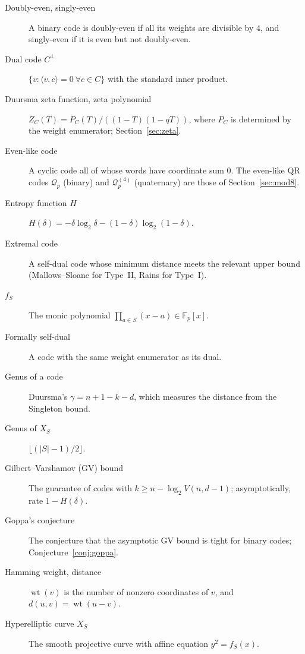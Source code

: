 \documentclass[12pt,letterpaper]{article}
\theoremstyle{definition}
\theoremstyle{remark}
\numberwithin{equation}{section}
\newcommand{\Fp}{\mathbb{F}_p}
\newcommand{\wt}{\operatorname{wt}}
\begin{document}
\begin{description}
\item[Doubly-even, singly-even] A binary code is doubly-even if all its weights are
divisible by $4$, and singly-even if it is even but not doubly-even.

\item[Dual code $C^\perp$] $\{v:\langle v,c\rangle=0\ \forall c\in C\}$ with the
standard inner product.

\item[Duursma zeta function, zeta polynomial] $Z_C(T)=P_C(T)/((1-T)(1-qT))$, where
$P_C$ is determined by the weight enumerator; Section~\ref{sec:zeta}.

\item[Even-like code] A cyclic code all of whose words have coordinate sum $0$. The
even-like QR codes $\mathcal Q_p$ (binary) and $\mathcal Q^{(4)}_p$ (quaternary) are
those of Section~\ref{sec:mod8}.

\item[Entropy function $H$] $H(\delta)=-\delta\log_2\delta-(1-\delta)\log_2(1-\delta)$.

\item[Extremal code] A self-dual code whose minimum distance meets the relevant
upper bound (Mallows--Sloane for Type~II, Rains for Type~I).

\item[$f_S$] The monic polynomial $\prod_{a\in S}(x-a)\in\Fp[x]$.

\item[Formally self-dual] A code with the same weight enumerator as its dual.

\item[Genus of a code] Duursma's $\gamma=n+1-k-d$, which measures the distance from
the Singleton bound.

\item[Genus of $X_S$] $\lfloor(|S|-1)/2\rfloor$.

\item[Gilbert--Varshamov (GV) bound] The guarantee of codes with
$k\ge n-\log_2V(n,d-1)$; asymptotically, rate $1-H(\delta)$.

\item[Goppa's conjecture] The conjecture that the asymptotic GV bound is tight for
binary codes; Conjecture~\ref{conj:goppa}.

\item[Hamming weight, distance] $\wt(v)$ is the number of nonzero coordinates of
$v$, and $d(u,v)=\wt(u-v)$.

\item[Hyperelliptic curve $X_S$] The smooth projective curve with affine equation
$y^2=f_S(x)$.


\end{description}
\end{document}
